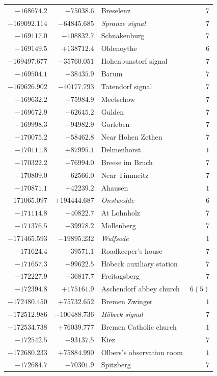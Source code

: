 \begin{center}
\begin{tabular}{r|r|p{170pt}|r}
\(-168674.2\)&\(-75038.6\)&Breselenz&\(7\)\\
\(-169092.114\)&\(-64845.685\)&\textit{Spranze signal}&\(7\)\\
\(-169117.0\)&\(-108832.7\)&Schnakenburg&\(7\)\\
\(-169149.5\)&\(+138712.4\)&Oldenoythe&\(6\)\\
\(-169497.677\)&\(-35760.051\)&Hohenbunstorf signal&\(7\)\\
\(-169504.1\)&\(-38435.9\)&Barum&\(7\)\\
\(-169626.902\)&\(-40177.793\)&Tatendorf signal&\(7\)\\
\(-169632.2\)&\(-75984.9\)&Meetschow&\(7\)\\
\(-169672.9\)&\(-62645.2\)&Gulden&\(7\)\\
\(-169998.3\)&\(-94982.9\)&Gorleben&\(7\)\\
\(-170075.2\)&\(-58462.8\)&Near Hohen Zethen&\(7\)\\
\(-170111.8\)&\(+87995.1\)&Delmenhorst&\(1\)\\
\(-170322.2\)&\(-76994.0\)&Breese im Bruch&\(7\)\\
\(-170809.0\)&\(-62566.0\)&Near Timmeitz&\(7\)\\
\(-170871.1\)&\(+42239.2\)&Ahausen&\(1\)\\
\(-171065.097\)&\(+194444.687\)&\textit{Onstwedde}&\(6\)\\
\(-171114.8\)&\(-40822.7\)&At Lohnholz&\(7\)\\
\(-171376.5\)&\(-39978.2\)&Mollenberg&\(7\)\\
\(-171465.593\)&\(-19895.232\)&\textit{Wulfsode}&\(1\)\\
\(-171624.4\)&\(-39571.1\)&Roadkeeper’s house&\(7\)\\
\(-171657.3\)&\(-99622.5\)&Höbeck auxiliary station&\(7\)\\
\(-172227.9\)&\(-36817.7\)&Freitagsberg&\(7\)\\
\(-172394.8\)&\(+175161.9\)&Aschendorf abbey church&\(6 (5)\)\\
\(-172480.450\)&\(+75732.652\)&Bremen Zwinger&\(1\)\\
\(-172512.986\)&\(-100488.736\)&\textit{Höbeck signal}&\(7\)\\
\(-172534.738\)&\(+76039.777\)&Bremen Catholic church&\(1\)\\
\(-172542.5\)&\(-93137.5\)&Kiez&\(7\)\\
\(-172680.233\)&\(+75884.990\)&Olbers’s observation room&\(1\)\\
\(-172684.7\)&\(-70301.9\)&Spitzberg&\(7\)\\
\hline\end{tabular}\endgroup\end{center}
